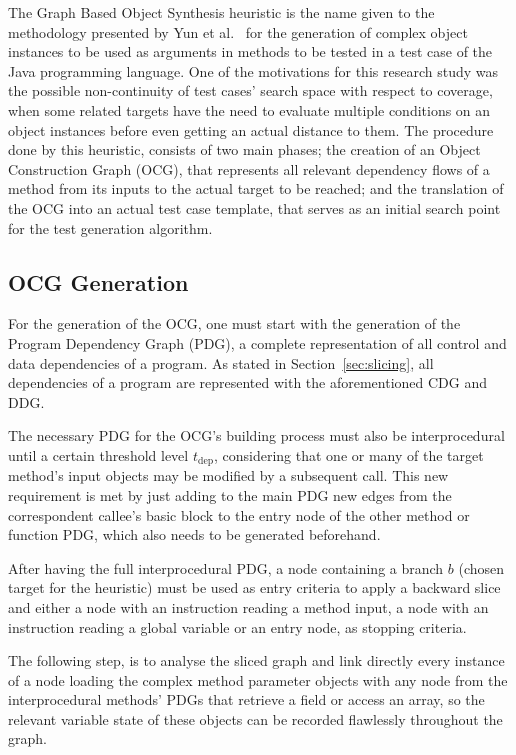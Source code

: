 \documentclass[%
  chapterprefix=false,%
  open=right,%
  twoside=true,%
  paper=a4,%
  logofile={Figures/logo.png},%
  thesistype=master,%
  UKenglish,%
]{se2thesis}
\begin{document}
The Graph Based Object Synthesis heuristic is the name given to the methodology presented by Yun et al.~\cite{DBLP:conf/sigsoft/0001O00D21} for the generation of complex object instances to be used as arguments in methods to be tested in a test case of the Java programming language.
One of the motivations for this research study was the possible non-continuity of test cases' search space with respect to coverage, when some related targets have the need to evaluate multiple conditions on an object instances before even getting an actual distance to them.
The procedure done by this heuristic, consists of two main phases; the creation of an Object Construction Graph (OCG), that represents all relevant dependency flows of a method from its inputs to the actual target to be reached; and the translation of the OCG into an actual test case template, that serves as an initial search point for the test generation algorithm.

\subsection{OCG Generation}\label{subsec:ocg_gen}

For the generation of the OCG, one must start with the generation of the Program Dependency Graph (PDG), a complete representation of all control and data dependencies of a program.
As stated in Section~\ref{sec:slicing}, all dependencies of a program are represented with the aforementioned CDG and DDG.\@

The necessary PDG for the OCG's building process must also be interprocedural until a certain threshold level \(t_{\text{dep}}\), considering that one or many of the target method's input objects may be modified by a subsequent call.
This new requirement is met by just adding to the main PDG new edges from the correspondent callee's basic block to the entry node of the other method or function PDG, which also needs to be generated beforehand.

After having the full interprocedural PDG, a node containing a branch \(b\) (chosen target for the heuristic) must be used as entry criteria to apply a backward slice and either a node with an instruction reading a method input, a node with an instruction reading a global variable or an entry node, as stopping criteria.

The following step, is to analyse the sliced graph and link directly every instance of a node loading the complex method parameter objects with any node from the interprocedural methods' PDGs that retrieve a field or access an array, so the relevant variable state of these objects can be recorded flawlessly throughout the graph.
\end{document}
